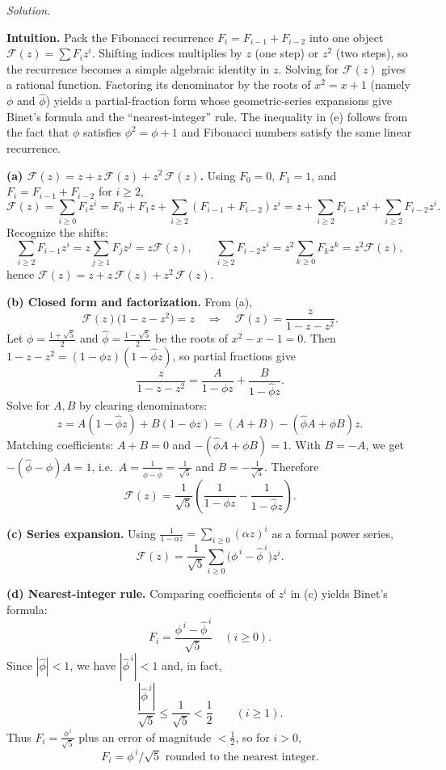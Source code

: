 \documentclass[12pt]{article}
\theoremstyle{definition}
\begin{document}
\medskip
\noindent\textit{Solution.}

\medskip
\noindent\textbf{Intuition.}
Pack the Fibonacci recurrence $F_i=F_{i-1}+F_{i-2}$ into one object $\mathcal{F}(z)=\sum F_i z^i$.  
Shifting indices multiplies by $z$ (one step) or $z^2$ (two steps), so the recurrence becomes a simple algebraic identity in $z$.  
Solving for $\mathcal{F}(z)$ gives a rational function. Factoring its denominator by the roots of $x^2=x+1$ (namely $\phi$ and $\hat\phi$) yields a partial-fraction form whose geometric-series expansions give Binet’s formula and the “nearest-integer” rule. The inequality in (e) follows from the fact that $\phi$ satisfies $\phi^2=\phi+1$ and Fibonacci numbers satisfy the same linear recurrence.

\medskip
\noindent\textbf{(a) $\mathcal{F}(z)=z+z\,\mathcal{F}(z)+z^2\,\mathcal{F}(z)$.}
Using $F_0=0$, $F_1=1$, and $F_i=F_{i-1}+F_{i-2}$ for $i\ge2$,
\[
\mathcal{F}(z)=\sum_{i\ge0}F_i z^i
=F_0+F_1 z+\sum_{i\ge2}(F_{i-1}+F_{i-2})z^i
=z+\sum_{i\ge2}F_{i-1}z^i+\sum_{i\ge2}F_{i-2}z^i.
\]
Recognize the shifts:
\[
\sum_{i\ge2}F_{i-1}z^i=z\sum_{j\ge1}F_j z^j=z\mathcal{F}(z),\qquad
\sum_{i\ge2}F_{i-2}z^i=z^2\sum_{k\ge0}F_k z^k=z^2\mathcal{F}(z),
\]
hence $\mathcal{F}(z)=z+z\,\mathcal{F}(z)+z^2\,\mathcal{F}(z)$.

\medskip
\noindent\textbf{(b) Closed form and factorization.}
From (a),
\[
\mathcal{F}(z)\big(1-z-z^2\big)=z
\quad\Rightarrow\quad
\mathcal{F}(z)=\frac{z}{1-z-z^2}.
\]
Let $\phi=\frac{1+\sqrt5}{2}$ and $\hat\phi=\frac{1-\sqrt5}{2}$ be the roots of $x^2-x-1=0$.  
Then $1-z-z^2=(1-\phi z)(1-\hat\phi z)$, so partial fractions give
\[
\frac{z}{1-z-z^2}=\frac{A}{1-\phi z}+\frac{B}{1-\hat\phi z}.
\]
Solve for $A,B$ by clearing denominators:
\[
z=A(1-\hat\phi z)+B(1-\phi z)=(A+B)-(\hat\phi A+\phi B)z.
\]
Matching coefficients: $A+B=0$ and $-(\hat\phi A+\phi B)=1$.  
With $B=-A$, we get $-(\hat\phi-\phi)A=1$, i.e.\ $A=\frac{1}{\phi-\hat\phi}=\frac{1}{\sqrt5}$ and $B=-\frac{1}{\sqrt5}$.  
Therefore
\[
\mathcal{F}(z)=\frac{1}{\sqrt{5}}\!\left(\frac{1}{1-\phi z}-\frac{1}{1-\hat\phi z}\right).
\]

\medskip
\noindent\textbf{(c) Series expansion.}
Using $\frac{1}{1-\alpha z}=\sum_{i\ge0}(\alpha z)^i$ as a formal power series,
\[
\mathcal{F}(z)=\frac{1}{\sqrt5}\sum_{i\ge0}\big(\phi^{\,i}-\hat\phi^{\,i}\big)z^i.
\]

\medskip
\noindent\textbf{(d) Nearest-integer rule.}
Comparing coefficients of $z^i$ in (c) yields Binet’s formula:
\[
F_i=\frac{\phi^{\,i}-\hat\phi^{\,i}}{\sqrt5}\quad (i\ge0).
\]
Since $|\hat\phi|<1$, we have $|\hat\phi^{\,i}|<1$ and, in fact,
\[
\frac{|\hat\phi^{\,i}|}{\sqrt5}\le\frac{1}{\sqrt5}<\frac{1}{2}\qquad(i\ge1).
\]
Thus $F_i=\frac{\phi^{\,i}}{\sqrt5}$ plus an error of magnitude $<\tfrac12$, so for $i>0$,
\[
\boxed{F_i=\text{$\phi^{\,i}/\sqrt5$ rounded to the nearest integer}.}
\]
\end{document}

